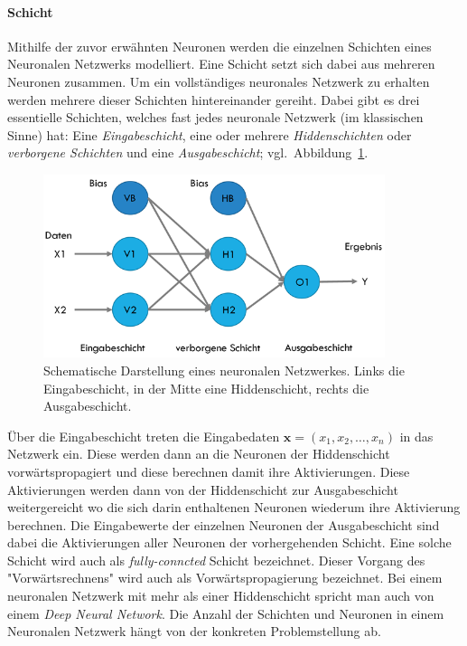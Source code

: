 \paragraph{Schicht}\label{basic:neural_network:layer} Mithilfe der zuvor erwähnten Neuronen werden die einzelnen Schichten eines Neuronalen Netzwerks modelliert. Eine Schicht setzt sich dabei aus mehreren Neuronen zusammen. Um ein vollständiges neuronales Netzwerk zu erhalten werden mehrere dieser Schichten hintereinander gereiht. Dabei gibt es drei essentielle Schichten, welches fast jedes neuronale Netzwerk (im klassischen Sinne) hat: Eine \emph{Eingabeschicht}, eine oder mehrere \emph{Hiddenschichten} oder \emph{verborgene Schichten} und eine \emph{Ausgabeschicht}; vgl.\ Abbildung~\ref{fig:schichten}.

\begin{figure}[h]
  \centering
  \includegraphics[width=10cm]{img/basic_neural_network}
  \caption{Schematische Darstellung eines neuronalen Netzwerkes. Links die Eingabeschicht, in der Mitte eine Hiddenschicht, rechts die Ausgabeschicht.}
  \label{fig:schichten}
\end{figure}

Über die Eingabeschicht treten die Eingabedaten $\mathbf{x} = (x_1, x_2, \dots, x_n)$ in das Netzwerk ein. Diese werden dann an die Neuronen der Hiddenschicht vorwärtspropagiert und diese berechnen damit ihre Aktivierungen. Diese Aktivierungen werden dann von der Hiddenschicht zur Ausgabeschicht weitergereicht wo die sich darin enthaltenen Neuronen wiederum ihre Aktivierung berechnen. Die Eingabewerte der einzelnen Neuronen der Ausgabeschicht sind dabei die Aktivierungen aller Neuronen der vorhergehenden Schicht. Eine solche Schicht wird auch als \emph{fully-conncted} Schicht bezeichnet. Dieser Vorgang des "Vorwärtsrechnens" wird auch als Vorwärtspropagierung bezeichnet. Bei einem neuronalen Netzwerk mit mehr als einer Hiddenschicht spricht man auch von einem \emph{Deep Neural Network}. Die Anzahl der Schichten und Neuronen in einem Neuronalen Netzwerk hängt von der konkreten Problemstellung ab.

